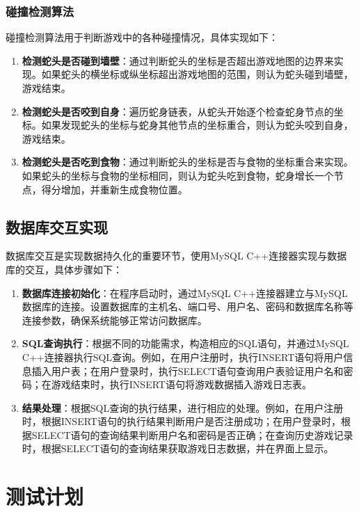 \documentclass{article}
\begin{document}
\subsubsection{碰撞检测算法}
碰撞检测算法用于判断游戏中的各种碰撞情况，具体实现如下：
\begin{enumerate}
    \item \textbf{检测蛇头是否碰到墙壁}：通过判断蛇头的坐标是否超出游戏地图的边界来实现。如果蛇头的横坐标或纵坐标超出游戏地图的范围，则认为蛇头碰到墙壁，游戏结束。
    \item \textbf{检测蛇头是否咬到自身}：遍历蛇身链表，从蛇头开始逐个检查蛇身节点的坐标。如果发现蛇头的坐标与蛇身其他节点的坐标重合，则认为蛇头咬到自身，游戏结束。
    \item \textbf{检测蛇头是否吃到食物}：通过判断蛇头的坐标是否与食物的坐标重合来实现。如果蛇头的坐标与食物的坐标相同，则认为蛇头吃到食物，蛇身增长一个节点，得分增加，并重新生成食物位置。
\end{enumerate}

\subsection{数据库交互实现}
数据库交互是实现数据持久化的重要环节，使用MySQL C++连接器实现与数据库的交互，具体步骤如下：
\begin{enumerate}
    \item \textbf{数据库连接初始化}：在程序启动时，通过MySQL C++连接器建立与MySQL数据库的连接。设置数据库的主机名、端口号、用户名、密码和数据库名称等连接参数，确保系统能够正常访问数据库。
    \item \textbf{SQL查询执行}：根据不同的功能需求，构造相应的SQL语句，并通过MySQL C++连接器执行SQL查询。例如，在用户注册时，执行INSERT语句将用户信息插入用户表；在用户登录时，执行SELECT语句查询用户表验证用户名和密码；在游戏结束时，执行INSERT语句将游戏数据插入游戏日志表。
    \item \textbf{结果处理}：根据SQL查询的执行结果，进行相应的处理。例如，在用户注册时，根据INSERT语句的执行结果判断用户是否注册成功；在用户登录时，根据SELECT语句的查询结果判断用户名和密码是否正确；在查询历史游戏记录时，根据SELECT语句的查询结果获取游戏日志数据，并在界面上显示。
\end{enumerate}

\section{测试计划}
\end{document}
